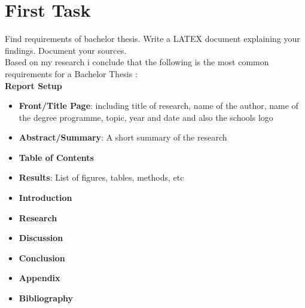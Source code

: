 \section{First Task}
Find requirements of bachelor thesis. Write a LATEX document explaining your
findings. Document your sources.\\

Based on my research i conclude that the following is the most common requirements for a Bachelor Thesis 
    \cite{guidelines-for-writing-your-thesis-report}
    \cite{get-thesis-how-to-write-a-winning-bachelor-thesis}
    \cite{oxford-thesis}:\\

\textbf{Report Setup}
\begin{itemize}
    \item \textbf{Front/Title Page}: including title of research, name of the author, name of the degree programme, topic, year and date and also the schools logo
    \item \textbf{Abstract/Summary}: A short summary of the research
    \item \textbf{Table of Contents}
    \item \textbf{Results}: List of figures, tables, methods, etc
    \item \textbf{Introduction}
    \item \textbf{Research}
    \item \textbf{Discussion}
    \item \textbf{Conclusion}
    \item \textbf{Appendix}
    \item \textbf{Bibliography}
\end{itemize}